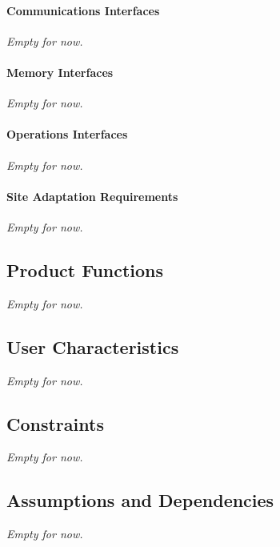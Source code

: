 	\paragraph{Communications Interfaces}
	\textit{Empty for now.}
	\paragraph{Memory Interfaces}
	\textit{Empty for now.}
	\paragraph{Operations Interfaces}
	\textit{Empty for now.}
	\paragraph{Site Adaptation Requirements}
	\textit{Empty for now.}
	
	\subsection{Product Functions}
	\textit{Empty for now.}
	
	\subsection{User Characteristics}
	\textit{Empty for now.}
	
	\subsection{Constraints}
	\textit{Empty for now.}
	
	\subsection{Assumptions and Dependencies}
	\textit{Empty for now.}
